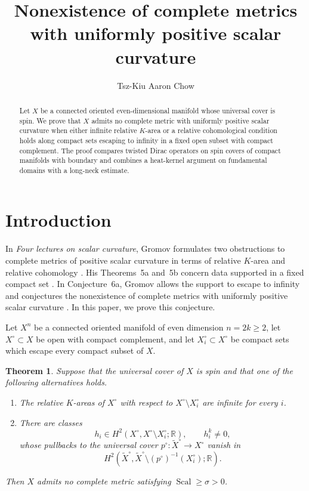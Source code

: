 \documentclass[12pt,reqno]{amsart}
\title[Nonexistence of complete metrics with positive scalar curvature]
{Nonexistence of complete metrics with uniformly positive scalar curvature}
\author{Tsz-Kiu Aaron Chow}
\numberwithin{equation}{section}
\newtheorem{theorem}{Theorem}[section]
\theoremstyle{definition}
\newcommand{\Sc}{\operatorname{Scal}}
\begin{document}
\begin{abstract}
Let $X$ be a connected oriented even-dimensional manifold whose
universal cover is spin.  We prove that $X$ admits no complete metric
with uniformly positive scalar curvature when either infinite relative
$K$-area or a relative cohomological condition holds along compact sets
escaping to infinity in a fixed open subset with compact complement.
The proof compares twisted Dirac operators on spin covers of compact
manifolds with boundary and combines a heat-kernel argument on
fundamental domains with a long-neck estimate.
\end{abstract}

\maketitle


\section{Introduction}

In \emph{Four lectures on scalar curvature}, Gromov formulates two
obstructions to complete metrics of positive scalar curvature in terms
of relative $K$-area and relative cohomology
\cite[\S4.7]{GromovFourLectures}.  His Theorems~5a and~5b concern data
supported in a fixed compact set
\cite[Theorems~5a and~5b]{GromovFourLectures}.  In Conjecture~6a,
Gromov allows the support to escape to infinity and conjectures the
nonexistence of complete metrics with uniformly positive scalar
curvature \cite[Conjecture~6a]{GromovFourLectures}.  In this paper,
we prove this conjecture.

Let $X^n$ be a connected oriented manifold of even dimension
$n=2k\geq2$, let $X^\circ\subset X$ be open with compact complement,
and let $X_i^\circ\subset X^\circ$ be compact sets which escape every
compact subset of $X$.

\begin{theorem}\label{thm:main}
Suppose that the universal cover of $X$ is spin and that one of the
following alternatives holds.
\begin{enumerate}[leftmargin=2.8em]
\renewcommand{\labelenumi}{\textup{(K)}}
\renewcommand{\theenumi}{\textup{(K)}}
\item\label{alt:K}
The relative $K$-areas of $X^\circ$ with respect to
$X^\circ\setminus X_i^\circ$ are infinite for every $i$.

\renewcommand{\labelenumi}{\textup{(H)}}
\renewcommand{\theenumi}{\textup{(H)}}
\item\label{alt:H}
There are classes
\[
 h_i\in H^2(X^\circ,X^\circ\setminus X_i^\circ;\mathbb R),
 \qquad h_i^k\ne0,
\]
whose pullbacks to the universal cover
$p^\circ:\widetilde X^\circ\to X^\circ$ vanish in
\[
 H^2\!\left(\widetilde X^\circ,
 \widetilde X^\circ\setminus(p^\circ)^{-1}(X_i^\circ);\mathbb R\right).
\]
\end{enumerate}
Then $X$ admits no complete metric satisfying $\Sc\geq\sigma>0$.
\end{theorem}
\end{document}

